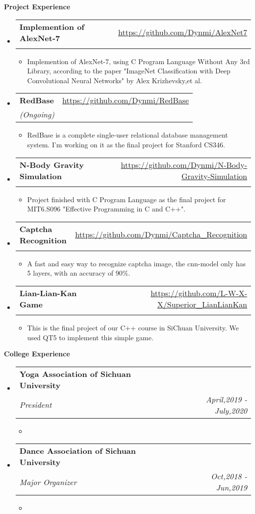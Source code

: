 \documentclass[letterpaper,11pt]{article}
\makeatletter
\newcommand{\resitem}[1]{\item #1 \vspace{-2pt}}
\newcommand{\resheading}[1]{{\large \colorbox{mygrey}{\begin{minipage}{\textwidth}{\textbf{#1 \vphantom{p\^{E}}}}\end{minipage}}}}
\newcommand{\ressubheading}[4]{
\begin{tabular*}{7.0in}{l@{\extracolsep{\fill}}r}
		\textbf{#1} & #2 \\
		\textit{#3} & \textit{#4} \\
\end{tabular*}\vspace{-6pt}}
\makeatother
\begin{document}
\resheading{Project Experience}
\begin{itemize}
\item
	\ressubheading{Implemention of AlexNet-7 }{\href{https://github.com/Dynmi/AlexNet7}{https://github.com/Dynmi/AlexNet7}}{}{}
	\begin{itemize}
		\resitem{Implemention of AlexNet-7, using C Program Language Without Any 3rd Library, according to the paper "ImageNet Classification with Deep Convolutional
Neural Networks" by Alex Krizhevsky,et al.}
	\end{itemize}
\item
	\ressubheading{RedBase }{\href{https://github.com/Dynmi/RedBase}{https://github.com/Dynmi/RedBase}}{(Ongoing)}{}
	\begin{itemize}
		\resitem{RedBase is a complete single-user relational database management system. I'm working on it as the final project for Stanford CS346. }
	\end{itemize}
\item
	\ressubheading{N-Body Gravity Simulation}{\href{https://github.com/Dynmi/N-Body-Gravity-Simulation}{https://github.com/Dynmi/N-Body-Gravity-Simulation}}{}{}
	\begin{itemize}
		\resitem{Project finished with C Program Language as the final project for MIT6.S096 "Effective Programming in C and C++".}
	\end{itemize}
\item
	\ressubheading{Captcha Recognition}{\href{https://github.com/Dynmi/Captcha\_Recognition}{https://github.com/Dynmi/Captcha\_Recognition}}{}{}
	\begin{itemize}
		\resitem{} A fast and easy way to recognize captcha image, the cnn-model only has 5 layers, with an accuracy of 90\%.
	\end{itemize}
\item
	\ressubheading{Lian-Lian-Kan Game}{\href{https://github.com/L-W-X-X/Superior\_LianLianKan}{https://github.com/L-W-X-X/Superior\_LianLianKan}}{}{}
	\begin{itemize}
		\resitem{} This is the final project of our C++ course in SiChuan University. We used QT5 to implement this simple game.
	\end{itemize}

\end{itemize}


\resheading{College Experience}
\begin{itemize}
\item
	\ressubheading{Yoga Association of Sichuan University}{}{President}{April,2019 - July,2020}
	\begin{itemize}
		\resitem{}
	\end{itemize}
\item
	\ressubheading{Dance Association of Sichuan University}{}{Major Organizer}{Oct,2018 - Jun,2019}
	\begin{itemize}
		\resitem{}
	\end{itemize}

\end{itemize}
\end{document}
